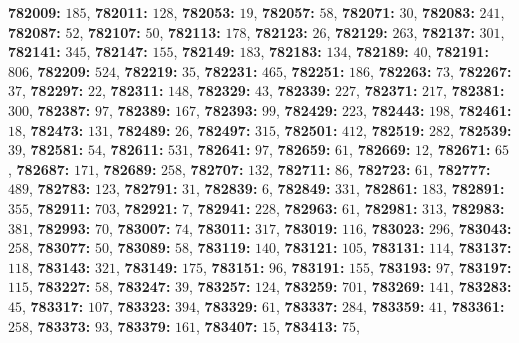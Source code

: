 \textsf{\bfseries 782009:} $185$, \textsf{\bfseries 782011:} $128$, \textsf{\bfseries 782053:} $19$, \textsf{\bfseries 782057:} $58$, \textsf{\bfseries 782071:} $30$, \textsf{\bfseries 782083:} $241$, \textsf{\bfseries 782087:} $52$, \textsf{\bfseries 782107:} $50$, \textsf{\bfseries 782113:} $178$, \textsf{\bfseries 782123:} $26$, \textsf{\bfseries 782129:} $263$, \textsf{\bfseries 782137:} $301$, \textsf{\bfseries 782141:} $345$, \textsf{\bfseries 782147:} $155$, \textsf{\bfseries 782149:} $183$, \textsf{\bfseries 782183:} $134$, \textsf{\bfseries 782189:} $40$, \textsf{\bfseries 782191:} $806$, \textsf{\bfseries 782209:} $524$, \textsf{\bfseries 782219:} $35$, \textsf{\bfseries 782231:} $465$, \textsf{\bfseries 782251:} $186$, \textsf{\bfseries 782263:} $73$, \textsf{\bfseries 782267:} $37$, \textsf{\bfseries 782297:} $22$, \textsf{\bfseries 782311:} $148$, \textsf{\bfseries 782329:} $43$, \textsf{\bfseries 782339:} $227$, \textsf{\bfseries 782371:} $217$, \textsf{\bfseries 782381:} $300$, \textsf{\bfseries 782387:} $97$, \textsf{\bfseries 782389:} $167$, \textsf{\bfseries 782393:} $99$, \textsf{\bfseries 782429:} $223$, \textsf{\bfseries 782443:} $198$, \textsf{\bfseries 782461:} $18$, \textsf{\bfseries 782473:} $131$, \textsf{\bfseries 782489:} $26$, \textsf{\bfseries 782497:} $315$, \textsf{\bfseries 782501:} $412$, \textsf{\bfseries 782519:} $282$, \textsf{\bfseries 782539:} $39$, \textsf{\bfseries 782581:} $54$, \textsf{\bfseries 782611:} $531$, \textsf{\bfseries 782641:} $97$, \textsf{\bfseries 782659:} $61$, \textsf{\bfseries 782669:} $12$, \textsf{\bfseries 782671:} $65$, \textsf{\bfseries 782687:} $171$, \textsf{\bfseries 782689:} $258$, \textsf{\bfseries 782707:} $132$, \textsf{\bfseries 782711:} $86$, \textsf{\bfseries 782723:} $61$, \textsf{\bfseries 782777:} $489$, \textsf{\bfseries 782783:} $123$, \textsf{\bfseries 782791:} $31$, \textsf{\bfseries 782839:} $6$, \textsf{\bfseries 782849:} $331$, \textsf{\bfseries 782861:} $183$, \textsf{\bfseries 782891:} $355$, \textsf{\bfseries 782911:} $703$, \textsf{\bfseries 782921:} $7$, \textsf{\bfseries 782941:} $228$, \textsf{\bfseries 782963:} $61$, \textsf{\bfseries 782981:} $313$, \textsf{\bfseries 782983:} $381$, \textsf{\bfseries 782993:} $70$, \textsf{\bfseries 783007:} $74$, \textsf{\bfseries 783011:} $317$, \textsf{\bfseries 783019:} $116$, \textsf{\bfseries 783023:} $296$, \textsf{\bfseries 783043:} $258$, \textsf{\bfseries 783077:} $50$, \textsf{\bfseries 783089:} $58$, \textsf{\bfseries 783119:} $140$, \textsf{\bfseries 783121:} $105$, \textsf{\bfseries 783131:} $114$, \textsf{\bfseries 783137:} $118$, \textsf{\bfseries 783143:} $321$, \textsf{\bfseries 783149:} $175$, \textsf{\bfseries 783151:} $96$, \textsf{\bfseries 783191:} $155$, \textsf{\bfseries 783193:} $97$, \textsf{\bfseries 783197:} $115$, \textsf{\bfseries 783227:} $58$, \textsf{\bfseries 783247:} $39$, \textsf{\bfseries 783257:} $124$, \textsf{\bfseries 783259:} $701$, \textsf{\bfseries 783269:} $141$, \textsf{\bfseries 783283:} $45$, \textsf{\bfseries 783317:} $107$, \textsf{\bfseries 783323:} $394$, \textsf{\bfseries 783329:} $61$, \textsf{\bfseries 783337:} $284$, \textsf{\bfseries 783359:} $41$, \textsf{\bfseries 783361:} $258$, \textsf{\bfseries 783373:} $93$, \textsf{\bfseries 783379:} $161$, \textsf{\bfseries 783407:} $15$, \textsf{\bfseries 783413:} $75$, 
